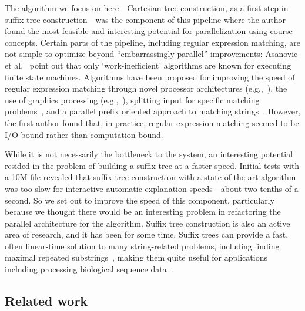 \documentclass[10pt]{article}
\begin{document}
The algorithm we focus on here---Cartesian tree construction, as a first step in suffix tree
construction---was the component of this pipeline where the author found
the most feasible and interesting potential for parallelization using course concepts.
Certain parts of the pipeline, including regular expression matching, are not simple to optimize
beyond ``embarrassingly parallel'' improvements:
Asanovic et al.~\cite{asanovic_view_2009} point out that only `work-inefficient' algorithms are
known for executing finite state machines.
Algorithms have been proposed for improving the speed of regular expression matching through
novel processor architectures (e.g.,~\cite{brodie_scalable_2006}), the use of graphics processing
(e.g.,~\cite{vasiliadis_regular_2009}), splitting input for specific matching
problems~\cite{jones_parallelizing_2009}, and a parallel prefix oriented approach to matching
strings~\cite{hillis_data_1986}.
However, the first author found that, in practice, regular expression matching seemed to be
I/O-bound rather than computation-bound.

While it is not necessarily the bottleneck to the system, an interesting potential resided in
the problem of building a suffix tree at a faster speed.
Initial tests with a 10M file revealed that suffix tree construction with a state-of-the-art
algorithm~\cite{shun_simple_2014} was too slow for interactive automatic explanation speeds---about
two-tenths of a second.
So we set out to improve the speed of this component, particularly because we thought there would
be an interesting problem in refactoring the parallel architecture for the algorithm.
Suffix tree construction is also an active area of research, and it has been for some time.
Suffix trees can provide a fast, often linear-time solution to many string-related problems, 
including finding maximal repeated substrings~\cite{gusfield_algorithms_1997}, making them quite
useful for applications including processing biological sequence
data~\cite{bieganski_generalized_1994}.

\subsection{Related work}
\end{document}
